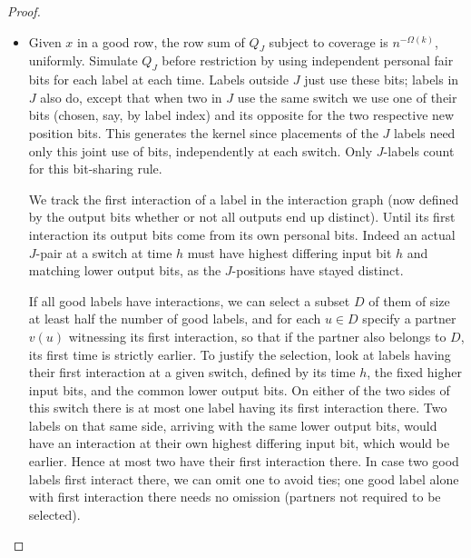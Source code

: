 \begin{proof}
\label{tra:first-interactions:first-meeting-deletion}
\begin{itemize}
\item Given \(x\) in a good row, the row sum of \(Q_J\) subject to coverage is \(n^{-\Omega(k)}\), uniformly. Simulate \(Q_J\) before restriction by using independent personal fair bits for each label at each time. Labels outside \(J\) just use these bits; labels in \(J\) also do, except that when two in \(J\) use the same switch we use one of their bits (chosen, say, by label index) and its opposite for the two respective new position bits. This generates the kernel since placements of the \(J\) labels need only this joint use of bits, independently at each switch. Only \(J\)-labels count for this bit-sharing rule.

  We track the first interaction of a label in the interaction graph (now defined by the output bits whether or not all outputs end up distinct). Until its first interaction its output bits come from its own personal bits. Indeed an actual \(J\)-pair at a switch at time \(h\) must have highest differing input bit \(h\) and matching lower output bits, as the \(J\)-positions have stayed distinct.

  If all good labels have interactions, we can select a subset \(D\) of them of size at least half the number of good labels, and for each \(u\in D\) specify a partner \(v(u)\) witnessing its first interaction, so that if the partner also belongs to \(D\), its first time is strictly earlier. To justify the selection, look at labels having their first interaction at a given switch, defined by its time \(h\), the fixed higher input bits, and the common lower output bits. On either of the two sides of this switch there is at most one label having its first interaction there. Two labels on that same side, arriving with the same lower output bits, would have an interaction at their own highest differing input bit, which would be earlier. Hence at most two have their first interaction there. In case two good labels first interact there, we can omit one to avoid ties; one good label alone with first interaction there needs no omission (partners not required to be selected).


\end{itemize}
\end{proof}
